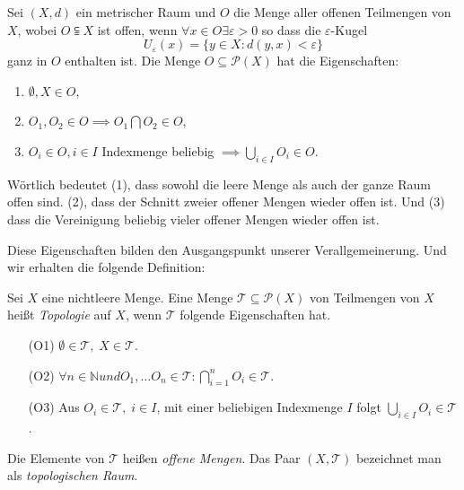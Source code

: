 {
    Sei $(X,d)$ ein metrischer Raum und $O$ die Menge aller offenen Teilmengen von $X$,
    wobei $O \subseteqq X$ ist offen, wenn $\forall x \in O \exists \varepsilon > 0$ so dass die $\varepsilon$-Kugel
    $$
        U_\varepsilon(x) = \{ y \in X : d(y,x) < \varepsilon \}
    $$
    ganz in $O$ enthalten ist. 
    Die Menge $O \subseteq \mathcal{P}(X)$ hat die Eigenschaften:
    \begin{enumerate}
        \item $\emptyset, X \in O$,
        \item $O_1, O_2 \in O \implies O_1 \bigcap O_2 \in O$,
        \item $O_i \in O, i \in I$ Indexmenge beliebig $\implies \bigcup_{i \in I} O_i \in O$.
    \end{enumerate}
    Wörtlich bedeutet (1), dass sowohl die leere Menge als auch der ganze Raum
    offen sind. (2), dass der Schnitt zweier offener Mengen wieder offen ist.
    Und (3) dass die Vereinigung beliebig vieler offener Mengen wieder offen ist.
}

Diese Eigenschaften bilden den Ausgangspunkt unserer Verallgemeinerung. Und wir erhalten die folgende Definition:


{
    Sei $X$ eine nichtleere Menge. Eine Menge $\mathcal{T} \subseteq \mathcal{P}(X)$ von Teilmengen 
von $X$ heißt \emph{Topologie} auf $X$, wenn $\mathcal{T}$ folgende Eigenschaften hat.
\begin{itemize}
    \item[(O1)] $\emptyset \in \mathcal{T}, \; X \in \mathcal{T}$.
    \item[(O2)] $\forall n \in \mathbb{N} und O_1, \dots O_n \in \mathcal{T} : 
     \bigcap_{i=1}^{n} O_i \in \mathcal{T}$.
    \item[(O3)] Aus $O_i \in \mathcal{T}, \; i \in I$, mit einer beliebigen Indexmenge $I$ folgt 
    $\bigcup_{i \in I} O_i \in \mathcal{T}$.
\end{itemize}
Die Elemente von $\mathcal{T}$ heißen \emph{offene Mengen}. Das Paar $(X, \mathcal{T})$ 
bezeichnet man als \emph{topologischen Raum}.
}

